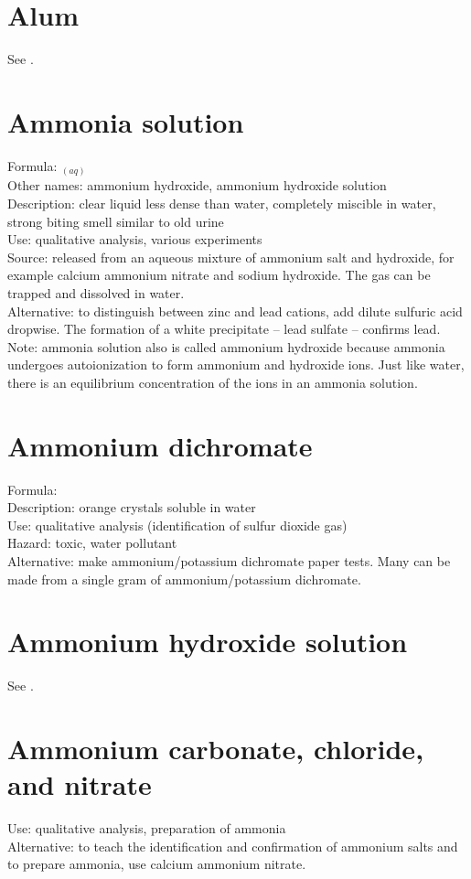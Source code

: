 \section{Alum}
See .

\section{Ammonia solution}
\label{sec:ammoniasol}
Formula: $_{(aq)}$\\
Other names: ammonium hydroxide, 
ammonium hydroxide solution\\
Description: clear liquid less dense than water, 
completely miscible in water, 
strong biting smell similar to old urine\\
Use: qualitative analysis, various experiments\\
Source: released from an aqueous mixture of ammonium salt and hydroxide, 
for example calcium ammonium nitrate and sodium hydroxide. 
The gas can be trapped and dissolved in water.\\
Alternative: to distinguish between zinc and lead cations, 
add dilute sulfuric acid dropwise. 
The formation of a white precipitate -- lead sulfate -- confirms lead.
Note: ammonia solution also is called ammonium hydroxide 
because ammonia undergoes autoionization to form ammonium and hydroxide ions. 
Just like water, 
there is an equilibrium concentration of the ions in an ammonia solution.

\section{Ammonium dichromate}
Formula: \\
Description: orange crystals soluble in water\\
Use: qualitative analysis (identification of sulfur dioxide gas)\\
Hazard: toxic, 
water pollutant\\
Alternative: make ammonium/potassium dichromate paper tests. 
Many can be made from a single gram of ammonium/potassium dichromate.

\section{Ammonium hydroxide solution}
See .

\section{Ammonium carbonate, chloride, and nitrate}
Use: qualitative analysis, 
preparation of ammonia\\
Alternative: to teach the identification 
and confirmation of ammonium salts and to prepare ammonia, 
use calcium ammonium nitrate.

